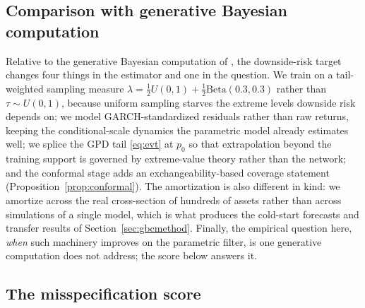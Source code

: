 \documentclass[11pt]{article}
\theoremstyle{remark}
\begin{document}
\subsection{Comparison with generative Bayesian computation}\label{sec:polsondelta}

Relative to the generative Bayesian computation of
\citet{polson2023gbc}, the downside-risk target changes four things in
the estimator and one in the question. We train on a tail-weighted
sampling measure $\lambda = \tfrac12 U(0,1) + \tfrac12
\mathrm{Beta}(0.3,0.3)$ rather than $\tau\sim U(0,1)$, because
uniform sampling starves the extreme levels downside risk depends on;
we model GARCH-standardized residuals rather than raw returns, keeping
the conditional-scale dynamics the parametric model already estimates
well; we splice the GPD tail \eqref{eq:evt} at $p_0$ so that
extrapolation beyond the training support is governed by extreme-value
theory rather than the network; and the conformal stage adds an
exchangeability-based coverage statement
(Proposition~\ref{prop:conformal}). The amortization is also different
in kind: we amortize across the real cross-section of hundreds of
assets rather than across simulations of a single model, which is what
produces the cold-start forecasts and transfer results of
Section~\ref{sec:gbcmethod}. Finally, the empirical question here,
\emph{when} such machinery improves on the parametric filter, is one
generative computation does not address; the score below answers
it.

\subsection{The misspecification score}\label{sec:score}
\end{document}

